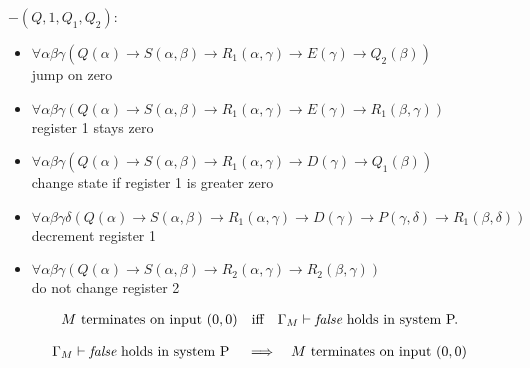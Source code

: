$-(Q,1,Q_1,Q_2):$
\begin{itemize}
\item $\forall\alpha\beta\gamma(Q(\alpha)\to S(\alpha,\beta)\to R_1(\alpha,\gamma)\to E(\gamma)\to Q_2(\beta))$\\jump on zero
\item $\forall\alpha\beta\gamma(Q(\alpha)\to S(\alpha,\beta)\to R_1(\alpha,\gamma)\to E(\gamma)\to R_1(\beta,\gamma))$\\register 1 stays zero
\item $\forall\alpha\beta\gamma(Q(\alpha)\to S(\alpha,\beta)\to R_1(\alpha,\gamma)\to D(\gamma)\to Q_1(\beta))$\\change state if register 1 is greater zero
\item $\forall\alpha\beta\gamma\delta(Q(\alpha)\to S(\alpha,\beta)\to R_1(\alpha,\gamma)\to D(\gamma) \to P(\gamma,\delta)\to R_1(\beta,\delta))$\\decrement register 1
\item $\forall\alpha\beta\gamma(Q(\alpha)\to S(\alpha,\beta)\to R_2(\alpha,\gamma)\to R_2(\beta,\gamma))$\\do not change register 2
\end{itemize}
\begin{lemma}
\begin{align*}
&\text{$M$ terminates on input $(0,0)$}&& \text{iff} &\text{$\Gamma_M\vdash\emph{false}$ holds in system P.}
\end{align*}
\end{lemma}
\begin{claim}
\begin{align*}
&\text{$\Gamma_M\vdash\emph{false}$ holds in system P} && \implies &\text{$M$ terminates on input $(0,0)$}
\end{align*}
\end{claim}

